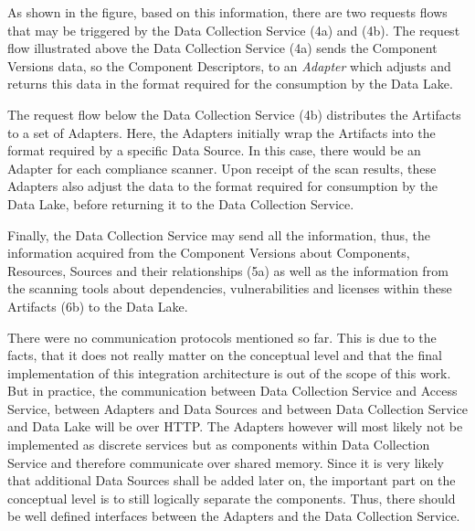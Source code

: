As shown in the figure, based on this information, there are two requests flows that may be triggered by the Data Collection Service (4a) and (4b). The request flow illustrated above the Data Collection Service (4a) sends the Component Versions data, so the Component Descriptors, to an \emph{Adapter} which adjusts and returns this data in the format required for the consumption by the Data Lake.\par 
The request flow below the Data Collection Service (4b) distributes the Artifacts to a set of Adapters. Here, the Adapters initially wrap the Artifacts into the format required by a specific Data Source. In this case, there would be an Adapter for each compliance scanner. Upon receipt of the scan results, these Adapters also adjust the data to the format required for consumption by the Data Lake, before returning it to the Data Collection Service.\par 
Finally, the Data Collection Service may send all the information, thus, the information acquired from the Component Versions about Components, Resources, Sources and their relationships (5a) as well as the information from the scanning tools about dependencies, vulnerabilities and licenses within these Artifacts (6b) to the Data Lake.\par
There were no communication protocols mentioned so far. This is due to the facts, that it does not really matter on the conceptual level and that the final implementation of this integration architecture is out of the scope of this work. But in practice, the communication between Data Collection Service and Access Service, between Adapters and Data Sources and between Data Collection Service and Data Lake will be over HTTP. The Adapters however will most likely not be implemented as discrete services but as components within Data Collection Service and therefore communicate over shared memory. Since it is very likely that additional Data Sources shall be added later on, the important part on the conceptual level is to still logically separate the components. Thus, there should be well defined interfaces between the Adapters and the Data Collection Service.



